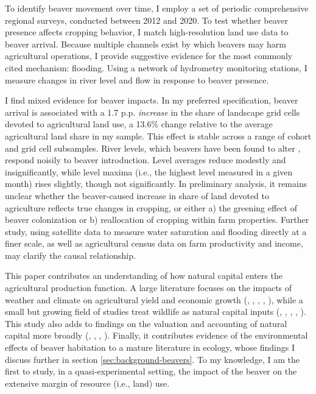 To identify beaver movement over time, I employ a set of periodic comprehensive regional surveys, conducted between 2012 and 2020. To test whether beaver presence affects cropping behavior, I match high-resolution land use data to beaver arrival. Because multiple channels exist by which beavers may harm agricultural operations, I provide suggestive evidence for the most commonly cited mechanism: flooding. Using a network of hydrometry monitoring stations, I measure changes in river level and flow in response to beaver presence.

I find mixed evidence for beaver impacts. In my preferred specification, beaver arrival is associated with a 1.7 p.p. \textit{increase} in the share of landscape grid cells devoted to agricultural land use, a 13.6\% change relative to the average agricultural land share in my sample. This effect is stable across a range of cohort and grid cell subsamples. River levels, which beavers have been found to alter \citep{swinnen_environmental_2019}, respond noisily to beaver introduction. Level averages reduce modestly and insignificantly, while level maxima (i.e., the highest level measured in a given month) rises slightly, though not significantly. In preliminary analysis, it remains unclear whether the beaver-caused increase in share of land devoted to agriculture reflects true changes in cropping, or either a) the greening effect of beaver colonization or b) reallocation of cropping within farm properties. Further study, using satellite data to measure water saturation and flooding directly at a finer scale, as well as agricultural census data on farm productivity and income, may clarify the causal relationship.

This paper contributes an understanding of how natural capital enters the agricultural production function. A large literature focuses on the impacts of weather and climate on agricultural yield and economic growth (\cite{mendelsohn_impact_1994}, \cite{schlenker_impact_2006}, \cite{schlenker_nonlinear_2009}, \cite{hsiang_causal_2014}, \cite{taylor_environmental_2021}), while a small but growing field of studies treat wildlife as natural capital inputs (\cite{frank_economic_2024}, \cite{rucker_colony_2019}, \cite{champetier_bioeconomics_2015}, \cite{kawasaki_impact_2023}, \cite{devkota_assessing_2024}). This study also adds to findings on the valuation and accounting of natural capital more broadly (\cite{lewis_nature_2024}, \cite{raynor_wolves_2021}, \cite{fenichel_measuring_2016}, \cite{fenichel_natural_2014} \cite{kareiva_natural_2011}). Finally, it contributes evidence of the environmental effects of beaver habitation to a mature literature in ecology, whose findings I discuss further in section \ref{sec:background-beavers}. To my knowledge, I am the first to study, in a quasi-experimental setting, the impact of the beaver on the extensive margin of resource (i.e., land) use.

